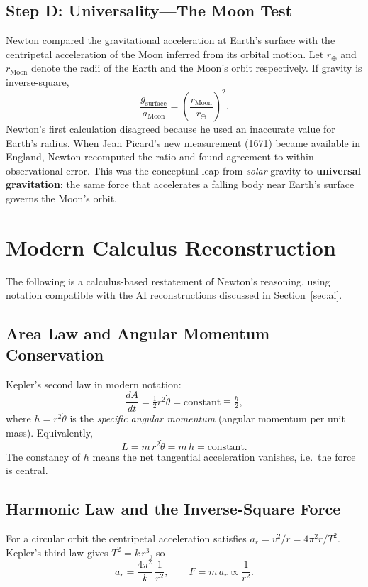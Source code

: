 \documentclass[12pt]{article}
\begin{document}
\subsection{Step D: Universality---The Moon Test}

Newton compared the gravitational acceleration at Earth's surface with the
centripetal acceleration of the Moon inferred from its orbital motion.
Let $r_{\oplus}$ and $r_{\text{Moon}}$ denote the radii of the Earth and the
Moon's orbit respectively.
If gravity is inverse-square,
\[
  \frac{g_{\text{surface}}}{a_{\text{Moon}}}
  = \left(\frac{r_{\text{Moon}}}{r_{\oplus}}\right)^{2}.
\]
Newton's first calculation disagreed because he used an inaccurate value for
Earth's radius.
When Jean Picard's new measurement (1671) became available in England,
Newton recomputed the ratio and found agreement to within observational error.
This was the conceptual leap from \emph{solar} gravity to
\textbf{universal gravitation}: the same force that accelerates a falling
body near Earth's surface governs the Moon's orbit.

\section{Modern Calculus Reconstruction}

The following is a calculus-based restatement of Newton's reasoning,
using notation compatible with the AI reconstructions discussed in
Section~\ref{sec:ai}.

\subsection{Area Law and Angular Momentum Conservation}

Kepler's second law in modern notation:
\[
  \frac{dA}{dt} = \tfrac{1}{2}r^{2}\dot\theta = \text{constant} \equiv \tfrac{h}{2},
\]
where $h = r^{2}\dot\theta$ is the \emph{specific angular momentum}
(angular momentum per unit mass).
Equivalently,
\[
  L = m\,r^{2}\dot\theta = m\,h = \text{constant}.
\]
The constancy of $h$ means the net tangential acceleration vanishes, i.e.\
the force is central.

\subsection{Harmonic Law and the Inverse-Square Force}

For a circular orbit the centripetal acceleration satisfies
$a_{r} = v^{2}/r = 4\pi^{2}r/T^{2}$.
Kepler's third law gives $T^{2} = k\,r^{3}$, so
\[
  a_{r} = \frac{4\pi^{2}}{k}\,\frac{1}{r^{2}}, \qquad
  F = m\,a_{r} \propto \frac{1}{r^{2}}.
\]
\end{document}
